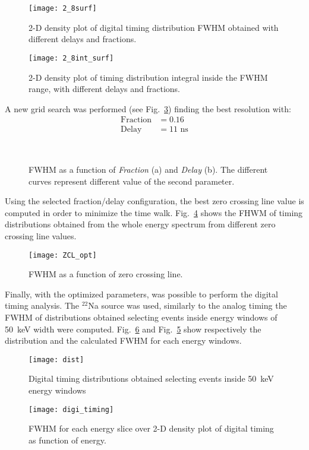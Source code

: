 \begin{figure}[H]
	\centering
	\texttt{[image: 2\_8surf]}
	\caption{2-D density plot of digital timing distribution FWHM obtained with different delays and fractions.}
	\label{Fig:Surf28}
\end{figure}

\begin{figure}[H]
	\centering
	\texttt{[image: 2\_8int\_surf]}
	\caption{2-D density plot of timing distribution integral inside the FWHM range, with different delays and fractions.}
	\label{Fig:Surf_int28}
\end{figure}
 
 A new grid search was performed (see Fig.~\ref{Fig:fd_opt}) finding the best resolution with:
 \[
 \begin{aligned}
\text{Fraction} &=0.16\\
\text{Delay}  &= 11 \text{~ns}
 \end{aligned}
 \]
 
 \begin{figure}[H]
 	\centering
 	 \quad
 	 \\
 	\caption{FWHM as a function of \emph{Fraction} (a) and \emph{Delay} (b). The different curves represent different value of the second parameter.}
 	\label{Fig:fd_opt}
 \end{figure}
 
 Using the selected fraction/delay configuration, the best zero crossing line value is computed in order to minimize the time walk. Fig.~\ref{Fig:Zcl} shows the FHWM of timing distributions obtained from the whole energy spectrum from different zero crossing line values.  
 
\begin{figure}[H]
	\centering
 	\texttt{[image: ZCL\_opt]}
 	\caption{FWHM as a function of zero crossing line.}
 	\label{Fig:Zcl}
 \end{figure}
 
 Finally, with the optimized parameters, was possible to perform the digital timing analysis. The $^{22}$Na source was used, similarly to the analog timing the FWHM of distributions obtained selecting events inside energy windows of 50~keV width were computed.  Fig.~\ref{Fig:Digi2d} and Fig.~\ref{Fig:DigiDist} show respectively the distribution and the calculated FWHM for each energy windows.
 
  \begin{figure}[H]
  	\centering
  	\texttt{[image: dist]}
  	\caption{Digital timing distributions obtained selecting events inside 50~keV energy windows}
  	\label{Fig:DigiDist}
  \end{figure}
  
   \begin{figure}[H]
   	\centering
   	\texttt{[image: digi\_timing]}
   	\caption{FWHM for each energy slice over 2-D density plot of digital timing as function of energy.}
   	\label{Fig:Digi2d}
   \end{figure}